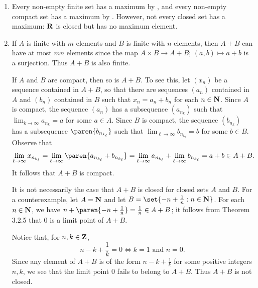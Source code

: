 \documentclass{lew98_solutions}
\begin{document}
\begin{solution}
    \begin{enumerate}
        \item Every non-empty finite set has a maximum by , and every non-empty compact set has a maximum by . However, not every closed set has a maximum: \( \mathbf{R} \) is closed but has no maximum element.

        \item If \( A \) is finite with \( m \) elements and \( B \) is finite with \( n \) elements, then \( A + B \) can have at most \( mn \) elements since the map \( A \times B \to A + B; \, (a, b) \mapsto a + b \) is a surjection. Thus \( A + B \) is also finite.

        If \( A \) and \( B \) are compact, then so is \( A + B \). To see this, let \( (x_n) \) be a sequence contained in \( A + B \), so that there are sequences \( (a_n) \) contained in \( A \) and \( (b_n) \) contained in \( B \) such that \( x_n = a_n + b_n \) for each \( n \in \mathbf{N} \). Since \( A \) is compact, the sequence \( (a_n) \) has a subsequence \( (a_{n_k}) \) such that \( \lim_{k \to \infty} a_{n_k} = a \) for some \( a \in A \). Since \( B \) is compact, the sequence \( (b_{n_k}) \) has a subsequence \( \paren{ b_{n_{k_{\ell}}} } \) such that \( \lim_{\ell \to \infty} b_{n_{k_{\ell}}} = b \) for some \( b \in B \). Observe that
        \[
            \lim_{\ell \to \infty} x_{n_{k_{\ell}}} = \lim_{\ell \to \infty} \paren{ a_{n_{k_{\ell}}} + b_{n_{k_{\ell}}} } = \lim_{\ell \to \infty} a_{n_{k_{\ell}}} + \lim_{\ell \to \infty} b_{n_{k_{\ell}}} = a + b \in A + B.
        \]
        It follows that \( A + B \) is compact.

        It is not necessarily the case that \( A + B \) is closed for closed sets \( A \) and \( B \). For a counterexample, let \( A = \mathbf{N} \) and let \( B = \set{ -n + \tfrac{1}{n} : n \in \N } \). For each \( n \in \mathbf{N} \), we have \( n + \paren{ -n + \tfrac{1}{n} } = \tfrac{1}{n} \in A + B \); it follows from Theorem 3.2.5 that 0 is a limit point of \( A + B \).
        
        Notice that, for \( n, k \in \mathbf{Z} \),
        \[
            n - k + \frac{1}{k} = 0 \iff k = 1 \text{ and } n = 0.
        \]
        Since any element of \( A + B \) is of the form \( n - k + \tfrac{1}{k} \) for some positive integers \( n, k \), we see that the limit point 0 fails to belong to \( A + B \). Thus \( A + B \) is not closed.


\end{enumerate}
\end{solution}
\end{document}
